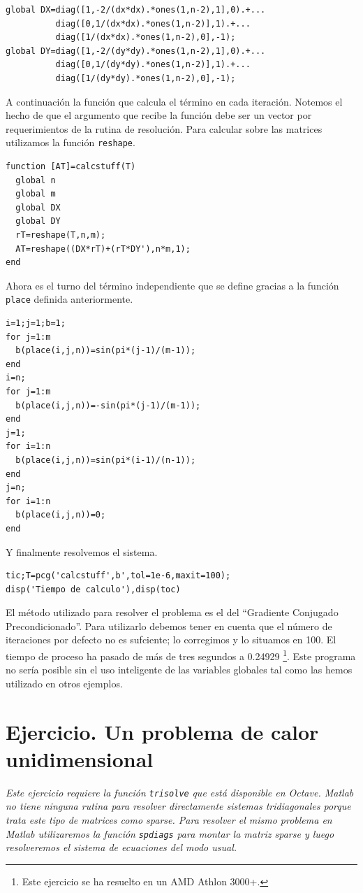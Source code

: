 \begin{verbatim}
global DX=diag([1,-2/(dx*dx).*ones(1,n-2),1],0).+...
          diag([0,1/(dx*dx).*ones(1,n-2)],1).+...
          diag([1/(dx*dx).*ones(1,n-2),0],-1);
global DY=diag([1,-2/(dy*dy).*ones(1,n-2),1],0).+...
          diag([0,1/(dy*dy).*ones(1,n-2)],1).+...
          diag([1/(dy*dy).*ones(1,n-2),0],-1);
\end{verbatim}
A continuación la función que calcula el término en cada iteración.
Notemos el hecho de que el argumento que recibe la función debe ser un
vector por requerimientos de la rutina de resolución. Para calcular
sobre las matrices utilizamos la función \texttt{reshape}.

\begin{verbatim}
function [AT]=calcstuff(T)
  global n
  global m
  global DX
  global DY
  rT=reshape(T,n,m);
  AT=reshape((DX*rT)+(rT*DY'),n*m,1);
end
\end{verbatim}
Ahora es el turno del término independiente que se define gracias a la
función \texttt{place} definida anteriormente.

\begin{verbatim}
i=1;j=1;b=1;
for j=1:m
  b(place(i,j,n))=sin(pi*(j-1)/(m-1));
end
i=n;
for j=1:m
  b(place(i,j,n))=-sin(pi*(j-1)/(m-1));
end
j=1;
for i=1:n
  b(place(i,j,n))=sin(pi*(i-1)/(n-1));
end
j=n;
for i=1:n
  b(place(i,j,n))=0;
end
\end{verbatim}
Y finalmente resolvemos el sistema.

\begin{verbatim}
tic;T=pcg('calcstuff',b',tol=1e-6,maxit=100);
disp('Tiempo de calculo'),disp(toc)
\end{verbatim}
El método utilizado para resolver el problema es el del {}``Gradiente
Conjugado Precondicionado''. Para utilizarlo debemos tener en cuenta
que el número de iteraciones por defecto no es sufciente; lo
corregimos y lo situamos en 100. El tiempo de proceso ha pasado de más
de tres segundos a 0.24929%
\footnote{Este ejercicio se ha resuelto en un AMD Athlon 3000+.%
}. Este programa no sería posible sin el uso inteligente de las
variables globales tal como las hemos utilizado en otros ejemplos.


\section{\label{sec:Ejercicio-(Octave)}Ejercicio.  Un problema de
calor unidimensional}

\emph{Este ejercicio requiere la función} \texttt{\emph{trisolve}}
\emph{que está disponible en Octave. Matlab no tiene ninguna rutina
  para resolver directamente sistemas tridiagonales porque trata este
  tipo de matrices como sparse. Para resolver el mismo problema en
  Matlab utilizaremos la función} \texttt{\emph{spdiags}} \emph{para
  montar la matriz sparse y luego resolveremos el sistema de
  ecuaciones del modo usual.}

